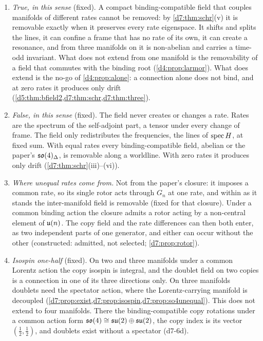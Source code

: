 \begin{remark}
\label{d7:rem:verdict}
\begin{enumerate}[label=(\alph*),leftmargin=2.2em]
\item \emph{True, in this sense} (fixed). A compact binding-compatible field that couples manifolds of different rates cannot be removed: by \cref{d7:thm:schr}(v) it is removable exactly when it preserves every rate eigenspace. It shifts and
splits the lines, it can confine a frame that has no rate of its own, it can create a resonance, and from three manifolds on it is non-abelian and
carries a time-odd invariant. What does not extend from one manifold is the removability of a field that commutes with the binding root
(\cref{d4:prop:larmor}). What does extend is the no-go of \cref{d4:prop:alone}: a connection alone does not bind, and at zero rates it produces
only drift (\cref{d5:thm:bfield2,d7:thm:schr,d7:thm:three}).
\item \emph{False, in this sense} (fixed). The field never creates or changes a rate. Rates are the spectrum of the self-adjoint part, a tensor under
every change of frame. The field only redistributes the frequencies, the lines of $\operatorname{spec} H$, at fixed sum. With equal rates every binding-compatible field, abelian or
the paper's $\mathfrak{so}(4)_\Delta$, is removable along a worldline. With zero rates it produces only drift (\cref{d7:thm:schr}(iii)--(vi)).
\item \emph{Where unequal rates come from.} Not from the paper's closure: it imposes a common rate, so its single rotor acts through $G_n$ at one rate, and within \cite{ES17} as it stands
the inter-manifold field is removable (fixed for that closure). Under a common binding action the closure admits a rotor acting by a non-central element
of $\mathfrak{u}(n)$. The copy field and the rate differences can then both enter, as two independent parts of one generator, and either can occur
without the other (constructed: admitted, not selected; \cref{d7:prop:rotor}).
\item \emph{Isospin one-half} (fixed). On two and three manifolds under a common Lorentz action the copy isospin is integral, and the doublet field on two copies is a connection
in one of its three directions only. On three manifolds doublets need the spectator action, where the Lorentz-carrying manifold is decoupled
(\cref{d7:prop:exist,d7:prop:isospin,d7:prop:so4unequal}). This does not extend to four manifolds. There the binding-compatible copy rotations under a common
action form $\mathfrak{so}(4)\cong\mathfrak{su}(2)\oplus\mathfrak{su}(2)$, the copy index is its vector $(\tfrac12,\tfrac12)$, and doublets exist without a spectator (d7-6d).

\end{enumerate}
\end{remark}
